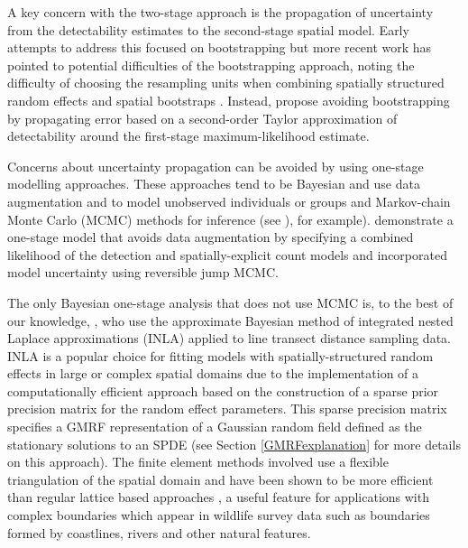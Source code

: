 \documentclass[preprint,12pt]{elsarticle}
\begin{document}
A key concern with the two-stage approach is the propagation of uncertainty from the detectability estimates to the second-stage spatial model.  Early attempts to address this focused on bootstrapping \citep{lahiri_resampling_2003, hedley_spatial_2004} but more recent work has pointed to potential difficulties of the bootstrapping approach, noting the difficulty of choosing the resampling units when combining spatially structured random effects and spatial bootstraps \citep{bravington_reliable_2018-1}. Instead, \cite{bravington_reliable_2018-1} propose avoiding bootstrapping by propagating error based on a second-order Taylor approximation of detectability around the first-stage maximum-likelihood estimate.

Concerns about uncertainty propagation can be avoided by using one-stage modelling approaches.  These approaches tend to be Bayesian and use data augmentation and to model unobserved individuals or groups and Markov-chain Monte Carlo (MCMC) methods for inference (see )\citep{royle_hierarchical_2008, schmidt_using_2012}, for example).  \cite{oedekoven_bayesian_2014} demonstrate a one-stage model that avoids data augmentation by specifying a combined likelihood of the detection and spatially-explicit count models and incorporated model uncertainty using reversible jump MCMC.  

The only Bayesian one-stage analysis that does not use MCMC is, to the best of our knowledge, \citet{yuan_point_2017}, who use the approximate Bayesian method of integrated nested Laplace approximations (INLA) \citep{rue_approximate_2009} applied to line transect distance sampling data.  INLA is a popular choice for fitting models with spatially-structured random effects in large or complex spatial domains due to the implementation of a computationally efficient approach based on the construction of a sparse prior precision matrix for the random effect parameters.  This sparse precision matrix specifies a GMRF representation of a Gaussian random field defined as the stationary solutions to an SPDE \citep{lindgren_explicit_2011} (see Section \ref{GMRFexplanation} for more details on this approach).  The finite element methods involved use a flexible triangulation of the spatial domain and have been shown to be more efficient than regular lattice based approaches \citep{simpson_going_2016}, a useful feature for applications with complex boundaries which appear in wildlife survey data such as boundaries formed by coastlines, rivers and other natural features. 
\end{document}
